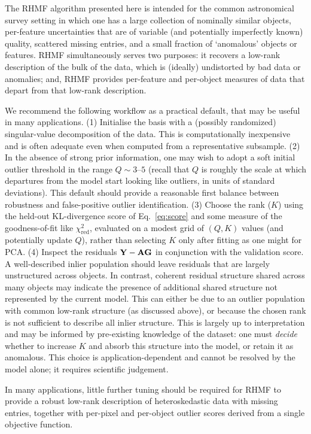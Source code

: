 \documentclass[onecolumn,floatfix,linenumbers,trackchanges]{aastex631}
\begin{document}

The RHMF algorithm presented here is intended for the common astronomical survey setting in which one has a large collection of nominally similar objects, per-feature uncertainties that are of variable (and potentially imperfectly known) quality, scattered missing entries, and a small fraction of `anomalous' objects or features.
RHMF simultaneously serves two purposes: it recovers a low-rank description of the bulk of the data, which is (ideally) undistorted by bad data or anomalies; and, RHMF provides per-feature and per-object measures of data that depart from that low-rank description.

We recommend the following workflow as a practical default, that may be useful in many applications.
(1) Initialise the basis with a (possibly randomized) singular-value decomposition of the data.
This is computationally inexpensive and is often adequate even when computed from a representative subsample.
(2) In the absence of strong prior information, one may wish to adopt a soft initial outlier threshold in the range $Q\sim 3$--$5$ (recall that $Q$ is roughly the scale at which departures from the model start looking like outliers, in units of standard deviations).
This default should provide a reasonable first balance between robustness and false-positive outlier identification.
(3) Choose the rank ($K$) using the held-out KL-divergence score of Eq.~\eqref{eq:score} and some measure of the goodness-of-fit like $\chi_\textrm{red}^2$, evaluated on a modest grid of $(Q, K)$ values (and potentially update $Q$), rather than selecting $K$ only after fitting as one might for PCA.
(4) Inspect the residuals ${\bf Y} - {\bf A} {\bf G}$ in conjunction with the validation score.
A well-described inlier population should leave residuals that are largely unstructured across objects.
In contrast, coherent residual structure shared across many objects may indicate the presence of additional shared structure not represented by the current model.
This can either be due to an outlier population with common low-rank structure (as discussed above), or because the chosen rank is not sufficient to describe all inlier structure.
This is largely up to interpretation and may be informed by pre-existing knowledge of the dataset: one must \emph{decide} whether to increase $K$ and absorb this structure into the model, or retain it as anomalous.
This choice is application-dependent and cannot be resolved by the model alone; it requires scientific judgement.

In many applications, little further tuning should be required for RHMF to provide a robust low-rank description of heteroskedastic data with missing entries, together with per-pixel and per-object outlier scores derived from a single objective function.
\end{document}
